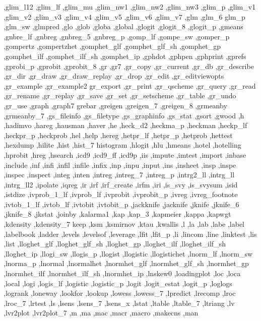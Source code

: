 {{    ,glim_l12 ,glim_lf ,glim_mu ,glim_nw1 ,glim_nw2 ,glim_nw3 ,glim_p
    ,glim_v1 ,glim_v2 ,glim_v3 ,glim_v4 ,glim_v5 ,glim_v6 ,glim_v7 ,glm
    ,glm_6 glm_p ,glm_sw ,glmpred ,glo ,glob ,globa ,global ,glogit
    ,glogit_8 ,glogit_p ,gmeans ,gnbre_lf ,gnbreg ,gnbreg_5 ,gnbreg_p
    ,gomp_lf ,gompe_sw ,gomper_p ,gompertz ,gompertzhet ,gomphet_glf
    ,gomphet_glf_sh ,gomphet_gp ,gomphet_ilf ,gomphet_ilf_sh ,gomphet_ip
    ,gphdot ,gphpen ,gphprint ,gprefs ,gprobi_p ,gprobit ,gprobit_8
    ,gr ,gr7 ,gr_copy ,gr_current ,gr_db ,gr_describe ,gr_dir ,gr_draw
    ,gr_draw_replay ,gr_drop ,gr_edit ,gr_editviewopts ,gr_example
    ,gr_example2 gr_export ,gr_print ,gr_qscheme ,gr_query ,gr_read
    ,gr_rename ,gr_replay ,gr_save ,gr_set ,gr_setscheme ,gr_table
    ,gr_undo ,gr_use ,graph ,graph7 grebar ,greigen ,greigen_7
    ,greigen_8 ,grmeanby ,grmeanby_7 ,gs_fileinfo ,gs_filetype
    ,gs_graphinfo ,gs_stat ,gsort ,gwood ,h ,hadimvo ,hareg ,hausman
    ,haver ,he ,heck_d2 ,heckma_p ,heckman ,heckp_lf ,heckpr_p ,heckprob
    ,hel ,help ,hereg ,hetpr_lf ,hetpr_p ,hetprob ,hettest ,hexdump
    ,hilite ,hist ,hist_7 histogram ,hlogit ,hlu ,hmeans ,hotel
    ,hotelling ,hprobit ,hreg ,hsearch ,icd9 ,icd9_ff ,icd9p ,iis
    ,impute ,imtest ,import ,inbase ,include ,inf ,infi ,infil ,infile ,infix
    ,inp ,inpu ,input ,ins ,insheet ,insp ,inspe ,inspec ,inspect ,integ
    ,inten ,intreg ,intreg_7 ,intreg_p ,intrg2_ll ,intrg_ll ,intrg_ll2
    ,ipolate ,iqreg ,ir ,irf ,irf_create ,irfm ,iri ,is_svy ,is_svysum
    ,isid ,istdize ,ivprob_1_lf ,ivprob_lf ,ivprobit ,ivprobit_p ,ivreg
    ,ivreg_footnote ,ivtob_1_lf ,ivtob_lf ,ivtobit ,ivtobit_p ,jackknife
    ,jacknife ,jknife ,jknife_6 ,jknife_8 ,jkstat ,joinby ,kalarma1
    ,kap ,kap_3 ,kapmeier ,kappa ,kapwgt ,kdensity ,kdensity_7 keep
    ,ksm ,ksmirnov ,ktau ,kwallis ,l ,la ,lab ,labe ,label ,labelbook
    ,ladder ,levels ,levelsof ,leverage ,lfit ,lfit_p ,li ,lincom ,line
    ,linktest ,lis ,list ,lloghet_glf ,lloghet_glf_sh ,lloghet_gp
    ,lloghet_ilf ,lloghet_ilf_sh ,lloghet_ip ,llogi_sw ,llogis_p
    ,llogist ,llogistic ,llogistichet ,lnorm_lf ,lnorm_sw ,lnorma_p
    ,lnormal ,lnormalhet ,lnormhet_glf ,lnormhet_glf_sh ,lnormhet_gp
    ,lnormhet_ilf ,lnormhet_ilf_sh ,lnormhet_ip ,lnskew0 ,loadingplot
    ,loc ,loca ,local ,logi ,logis_lf ,logistic ,logistic_p
    ,logit ,logit_estat ,logit_p ,loglogs ,logrank ,loneway ,lookfor
    ,lookup ,lowess ,lowess_7 ,lpredict ,lrecomp ,lroc ,lroc_7 ,lrtest
    ,ls ,lsens ,lsens_7 ,lsens_x ,lstat ,ltable ,ltable_7 ,ltriang
    ,lv ,lvr2plot ,lvr2plot_7 ,m ,ma ,mac ,macr ,macro ,makecns ,man
}}

